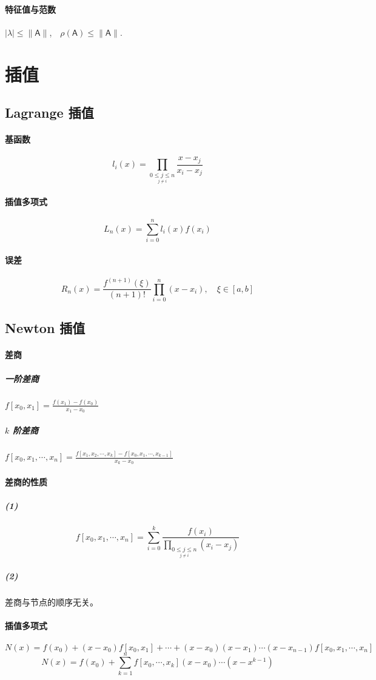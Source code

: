 \documentclass[a4paper,12pt]{article}
\begin{document}
\paragraph{特征值与范数} $|\lambda|\le\|\mathsf{A}\|$,\ \ $\rho(\mathsf{A})\le\|\mathsf{A}\|.$

\section{插值}
\subsection{Lagrange 插值}
\paragraph{基函数}
\[
l_i(x)=\underset{\underset{j\not=i}{0\le j\le n}}{\prod} \frac{x-x_j}{x_i-x_j}
\]
\paragraph{插值多项式}
\[
L_n(x)=\sum_{i=0}^{n}l_i(x)f(x_i)
\]
\paragraph{误差}
\[
R_n(x)=\frac{f^{(n+1)}(\xi)}{(n+1)!}\prod_{i=0}^{n}(x-x_i),\quad \xi\in[a,b]
\]
\subsection{Newton 插值}
\paragraph{差商}
\subparagraph{一阶差商} $f[x_0,x_1]=\frac{f(x_1)-f(x_0)}{x_1-x_0}$
\subparagraph{$k$ 阶差商} $f[x_0,x_1,\cdots,x_n]=\frac{f[x_1,x_2,\cdots,x_k]-f[x_0,x_1,\cdots,x_{k-1}]}{x_k-x_0}$
\paragraph{差商的性质}
\subparagraph{(1)} 
\[
f[x_0,x_1,\cdots,x_n]=\sum_{i=0}^{k}\frac{f(x_i)}{\underset{\underset{j\not=i}{0\le j\le n}}{\prod}(x_i-x_j)}
\]
\subparagraph{(2)} 差商与节点的顺序无关。 
\paragraph{插值多项式}
\[
N(x)=f(x_0)+(x-x_0)f[x_0,x_1]+\cdots+(x-x_0)(x-x_1)\cdots(x-x_{n-1})f[x_0,x_1,\cdots,x_n]
\]
\[
N(x)=f(x_0)+\sum_{k=1}^{n}f[x_0,\cdots,x_k](x-x_0)\cdots(x-x^{k-1})
\]
\end{document}
